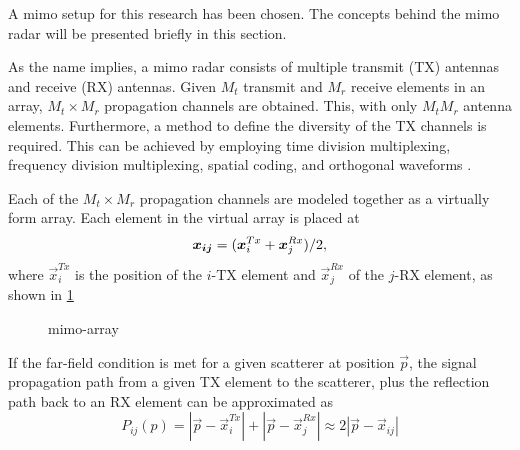 A \ac{mimo} setup for this research has been chosen. The concepts behind the \ac{mimo} radar will be presented briefly in this section. 

As the name implies, a \ac{mimo} radar consists of multiple transmit (TX) antennas and receive (RX) antennas. Given $M_t$ transmit and $M_r$ receive elements in an array, $M_t\times M_r$ propagation channels are obtained. This, with only $M_t
M_r$ antenna elements. Furthermore, a method to define the diversity of the TX channels is required. This can be achieved by employing time division multiplexing, frequency division multiplexing, spatial coding, and orthogonal waveforms \cite{huang_fmcw_2011}. 

Each of the  $M_t\times M_r$ propagation channels are modeled together as a virtually form array. Each element in the virtual array is placed at 
\begin{equation}
	\vec{x_{ij}} = (\vec{x}_i^{Tx}+\vec{x}_j^{Rx})/2\\,
\end{equation}
where $\vec{x}_i^{Tx}$ is the position of the $i$-TX element and $\vec{x}_j^{Rx}$ of the $j$-RX element, as shown in \cref{fig:mimo_array}

\begin{figure}[h]
	\centering
	
	\caption{\ac{mimo}-array}
		\label{fig:mimo_array}
\end{figure} 

 If the far-field condition is met for a given scatterer at position $\vec{p}$, the signal propagation path from a given TX element to the scatterer, plus the reflection path back to an RX element can be approximated as
 \begin{equation}
 	P_{ij}(p) = |\vec{p}-\vec{x}_i^{Tx}| + |\vec{p}-\vec{x}_j^{Rx}| \approx 2|\vec{p}-\vec{x}_{ij}| 
 \end{equation}